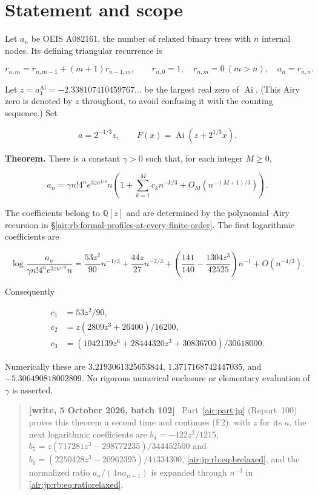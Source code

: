 \documentclass[11pt,letterpaper]{article}
\numberwithin{equation}{section}
\theoremstyle{remark}
\newenvironment{writenotejp}{\par\smallskip\begin{quote}\small\textbf{[write, 5 October 2026, batch 102]}\ }{\end{quote}\smallskip}
\begin{document}
\section{Statement and scope}\label{air:rb:statement-and-scope}

Let \(a_n\) be OEIS A082161, the number of relaxed binary trees with \(n\) internal nodes. Its defining triangular recurrence is

\[
r_{n,m}=r_{n,m-1}+(m+1)r_{n-1,m},\qquad
r_{n,0}=1,\quad r_{n,m}=0\ (m>n),\quad a_n=r_{n,n}.
\]

Let \(z=a_1^{\operatorname{Ai}}=-2.338107410459767\ldots\) be the largest real zero of \(\operatorname{Ai}\). (This Airy zero is denoted by \(z\) throughout, to avoid confusing it with the counting sequence.) Set

\[
a=2^{-1/3}z,\qquad F(x)=\operatorname{Ai}(z+2^{1/3}x).
\]

\textbf{Theorem.} There is a constant \(\gamma >0\) such that, for each integer \(M\ge 0\),

\[
a_n=\gamma n!4^n e^{3zn^{1/3}}n
\left(1+\sum_{k=1}^M c_kn^{-k/3}
+O_M(n^{-(M+1)/3})\right).
\tag{F1}
\]

The coefficients belong to \(\mathbb Q[z]\) and are determined by the polynomial--Airy recursion in \S\ref{air:rb:formal-profiles-at-every-finite-order}. The first logarithmic coefficients are

\[
\log\frac{a_n}{\gamma n!4^n e^{3zn^{1/3}}n}
=\frac{53z^2}{90}n^{-1/3}
+\frac{44z}{27}n^{-2/3}
+\left(\frac{141}{140}-\frac{1304z^3}{42525}\right)n^{-1}
+O(n^{-4/3}).
\tag{F2}
\]

Consequently

\[
\begin{aligned}
c_1&=53z^2/90,\\
c_2&=z(2809z^3+26400)/16200,\\
c_3&=(1042139z^6+28444320z^3+30836700)/30618000.
\end{aligned}
\tag{F3}
\]

Numerically these are \(3.2193061325653844\), \(1.3717168742447035\), and \(-5.306490818002809\). No rigorous numerical enclosure or elementary evaluation of \(\gamma\) is asserted.
\begin{writenotejp}
Part~\ref{air:part:jp} (Report~100) proves this theorem a second time and continues (F2): with $z$ for its $a$, the next logarithmic coefficients are $b_4=-422z^2/1215$, $b_5=z(717281z^3-298772235)/344452500$ and $b_6=(2250428z^3-20962395)/41334300$, \eqref{air:jp:rb:eq:brelaxed}, and the normalized ratio $a_n/(4na_{n-1})$ is expanded through $n^{-3}$ in \eqref{air:jp:rb:eq:ratiorelaxed}.
\end{writenotejp}
\end{document}
